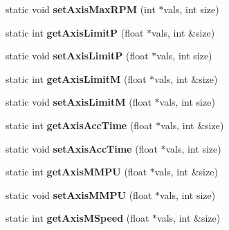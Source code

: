 \begin{DoxyCompactItemize}
\item 
\hypertarget{classRobotConf_a8b4607d77c3d1f08265e472eefff0284}{static void {\bfseries set\-Axis\-Max\-R\-P\-M} (int $\ast$vals, int size)}\label{classRobotConf_a8b4607d77c3d1f08265e472eefff0284}

\item 
\hypertarget{classRobotConf_ac24a258679986e28c5da1ed56d6aa182}{static int {\bfseries get\-Axis\-Limit\-P} (float $\ast$vals, int \&size)}\label{classRobotConf_ac24a258679986e28c5da1ed56d6aa182}

\item 
\hypertarget{classRobotConf_a90a068ca71cfb54f1062896d92ab4ed0}{static void {\bfseries set\-Axis\-Limit\-P} (float $\ast$vals, int size)}\label{classRobotConf_a90a068ca71cfb54f1062896d92ab4ed0}

\item 
\hypertarget{classRobotConf_ae60648e541518cde56c9999b083cd660}{static int {\bfseries get\-Axis\-Limit\-M} (float $\ast$vals, int \&size)}\label{classRobotConf_ae60648e541518cde56c9999b083cd660}

\item 
\hypertarget{classRobotConf_a34d02fea36c89b94353a0b2432c84cc1}{static void {\bfseries set\-Axis\-Limit\-M} (float $\ast$vals, int size)}\label{classRobotConf_a34d02fea36c89b94353a0b2432c84cc1}

\item 
\hypertarget{classRobotConf_a91a457fccb590fe0b6fac03e2cc136fb}{static int {\bfseries get\-Axis\-Acc\-Time} (float $\ast$vals, int \&size)}\label{classRobotConf_a91a457fccb590fe0b6fac03e2cc136fb}

\item 
\hypertarget{classRobotConf_af6fee2ac57c09aa1d86e405eff02122e}{static void {\bfseries set\-Axis\-Acc\-Time} (float $\ast$vals, int size)}\label{classRobotConf_af6fee2ac57c09aa1d86e405eff02122e}

\item 
\hypertarget{classRobotConf_a872ced75ad8b97b17ca6a22863843f4f}{static int {\bfseries get\-Axis\-M\-M\-P\-U} (float $\ast$vals, int \&size)}\label{classRobotConf_a872ced75ad8b97b17ca6a22863843f4f}

\item 
\hypertarget{classRobotConf_a1b687b2ea2291ec6ed56bb91e512b4e7}{static void {\bfseries set\-Axis\-M\-M\-P\-U} (float $\ast$vals, int size)}\label{classRobotConf_a1b687b2ea2291ec6ed56bb91e512b4e7}

\item 
\hypertarget{classRobotConf_a2b295f3f6e84276be00ffa70291d13f9}{static int {\bfseries get\-Axis\-M\-Speed} (float $\ast$vals, int \&size)}\label{classRobotConf_a2b295f3f6e84276be00ffa70291d13f9}


\end{DoxyCompactItemize}

